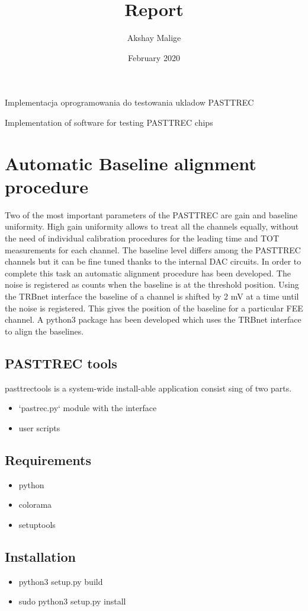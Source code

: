 \documentclass{article}
\title{ Report }
\author{Akshay Malige}
\date{February 2020}
\begin{document}
\begin{center}
Implementacja oprogramowania do testowania ukladow PASTTREC

Implementation of software for testing PASTTREC chips
\end{center}


\section*{Automatic Baseline alignment procedure}
Two of the most important parameters of the PASTTREC are gain and baseline uniformity.
High gain uniformity allows to treat all the channels equally, without the need of individual calibration procedures for the leading time and TOT measurements for each channel. The baseline level differs among the PASTTREC channels but it can be fine tuned thanks to the internal DAC circuits. In order to complete this task an automatic alignment procedure has been developed. The noise is registered as counts when the baseline is at the threshold position. Using the TRBnet interface the baseline of a channel is shifted by 2 mV at a time until the noise is registered. This gives the position of the baseline for a particular FEE channel. A python3 package has been developed which uses the TRBnet interface to align the baselines.

\subsection*{PASTTREC tools}

pasttrectools is a system-wide install-able application consist sing of two parts.
\begin{itemize}
  \item `pastrec.py` module with the interface
  \item user scripts
\end{itemize}

\subsection*{Requirements}
\begin{itemize}
  \item {python  }
  \item colorama
  \item setuptools
\end{itemize}

\subsection*{Installation}
\begin{itemize}
  \item python3 setup.py build
  \item sudo python3 setup.py install
\end{itemize}
\end{document}
